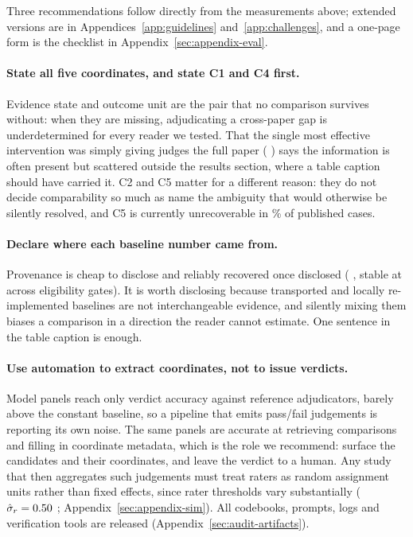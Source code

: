 Three recommendations follow directly from the measurements above; extended versions are in
Appendices~\ref{app:guidelines} and~\ref{app:challenges}, and a one-page form is the checklist in
Appendix~\ref{sec:appendix-eval}.

\paragraph{State all five coordinates, and state C1 and C4 first.}
Evidence state and outcome unit are the pair that no comparison survives without: when they are
missing, adjudicating a cross-paper gap is underdetermined for every reader we tested. That the
single most effective intervention was simply giving judges the full paper
(\LadVdDeltaCite{} \LadVdDeltaCiteCI{}) says the information is often present but scattered
outside the results section, where a table caption should have carried it. C2 and C5 matter for a
different reason: they do not decide comparability so much as name the ambiguity that would
otherwise be silently resolved, and C5 is currently unrecoverable in \SilentPct{}\% of published
cases.

\paragraph{Declare where each baseline number came from.}
Provenance is cheap to disclose and reliably recovered once disclosed (\DepPvAcc{} \DepPvCI{},
stable at \GateLooRangePct{} across eligibility gates). It is worth disclosing because
transported and locally re-implemented baselines are not interchangeable evidence, and silently
mixing them biases a comparison in a direction the reader cannot estimate. One sentence in the
table caption is enough.

\paragraph{Use automation to extract coordinates, not to issue verdicts.}
Model panels reach only \DepVdAcc{} verdict accuracy against reference adjudicators, barely above
the \DepVdBase{} constant baseline, so a pipeline that emits pass/fail judgements is reporting
its own noise. The same panels are accurate at retrieving comparisons and filling in coordinate
metadata, which is the role we recommend: surface the candidates and their coordinates, and leave
the verdict to a human. Any study that then aggregates such judgements must treat raters as
random assignment units rather than fixed effects, since rater thresholds vary substantially
($\hat\sigma_r=0.50{}$ \OwjSigPooledCI{}; Appendix~\ref{sec:appendix-sim}). All
codebooks, prompts, logs and verification tools are released
(Appendix~\ref{sec:audit-artifacts}).
